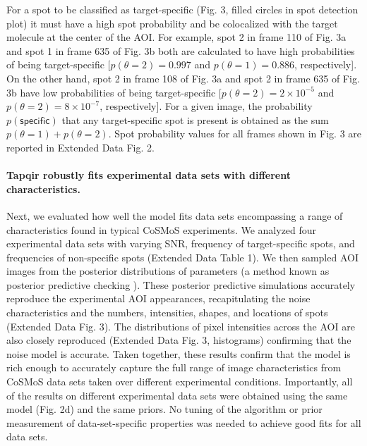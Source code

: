For a spot to be classified as target-specific (Fig. 3, filled circles in spot detection plot) it must have a high spot probability and be colocalized with the target molecule at the center of the AOI. For example, spot 2 in frame 110 of Fig. 3a and spot 1 in frame 635 of Fig. 3b both are calculated to have high probabilities of being target-specific [$p(\theta=2) = 0.997$ and $p(\theta=1) = 0.886$, respectively]. On the other hand, spot 2 in frame 108 of Fig. 3a and spot 2 in frame 635 of Fig. 3b have low probabilities of being target-specific [$p(\theta=2) = 2 \times 10^{-5}$ and $p(\theta=2) = 8 \times 10^{-7}$, respectively]. For a given image, the probability $p(\mathsf{specific})$ that any target-specific spot is present is obtained as the sum $p(\theta=1) + p(\theta=2)$. Spot probability values for all frames shown in Fig. 3 are reported in Extended Data Fig. 2.  

\paragraph{Tapqir robustly fits experimental data sets with different characteristics.}
Next, we evaluated how well the model fits data sets encompassing a range of characteristics found in typical CoSMoS experiments. We analyzed four experimental data sets with varying SNR, frequency of target-specific spots, and frequencies of non-specific spots (Extended Data Table 1). We then sampled AOI images from the posterior distributions of parameters (a method known as posterior predictive checking \cite{Gelman2013-ro}). These posterior predictive simulations accurately reproduce the experimental AOI appearances, recapitulating the noise characteristics and the numbers, intensities, shapes, and locations of spots (Extended Data Fig. 3).  The distributions of pixel intensities across the AOI are also closely reproduced (Extended Data Fig. 3, histograms) confirming that the noise model is accurate. Taken together, these results confirm that the model is rich enough to accurately capture the full range of image characteristics from CoSMoS data sets taken over different experimental conditions.  Importantly, all of the results on different experimental data sets were obtained using the same model (Fig. 2d) and the same priors.  No tuning of the algorithm or prior measurement of data-set-specific properties was needed to achieve good fits for all data sets.

